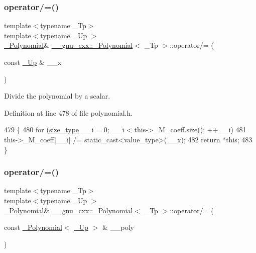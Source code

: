 \subsubsection{\texorpdfstring{operator/=()}{operator/=()}\hspace{0.1cm}{\footnotesize\ttfamily [1/2]}}
{\footnotesize\ttfamily template$<$typename \+\_\+\+Tp$>$ \\
template$<$typename \+\_\+\+Up $>$ \\
\hyperlink{class____gnu__cxx_1_1__Polynomial}{\+\_\+\+Polynomial}\& \hyperlink{class____gnu__cxx_1_1__Polynomial}{\+\_\+\+\_\+gnu\+\_\+cxx\+::\+\_\+\+Polynomial}$<$ \+\_\+\+Tp $>$\+::operator/= (\begin{DoxyParamCaption}\item[{const \hyperlink{class____gnu__cxx_1_1__Polynomial_a242114d4b86648a5dff67a8221f80d40}{\+\_\+\+Up} \&}]{\+\_\+\+\_\+x }\end{DoxyParamCaption})\hspace{0.3cm}{\ttfamily [inline]}}

Divide the polynomial by a scalar. 

Definition at line 478 of file polynomial.\+h.


\begin{DoxyCode}
479         \{
480           \textcolor{keywordflow}{for} (\hyperlink{class____gnu__cxx_1_1__Polynomial_a6afe219c123c7a2fdc5abac8a6639053}{size\_type} \_\_i = 0; \_\_i < this->\_M\_coeff.size(); ++\_\_i)
481             this->\_M\_coeff[\_\_i] /= static\_cast<value\_type>(\_\_x);
482           \textcolor{keywordflow}{return} *\textcolor{keyword}{this};
483         \}
\end{DoxyCode}
\mbox{\label{class____gnu__cxx_1_1__Polynomial_a3374e3ab44ed1478de27f688aae6c3f1}} 
\subsubsection{\texorpdfstring{operator/=()}{operator/=()}\hspace{0.1cm}{\footnotesize\ttfamily [2/2]}}
{\footnotesize\ttfamily template$<$typename \+\_\+\+Tp$>$ \\
template$<$typename \+\_\+\+Up $>$ \\
\hyperlink{class____gnu__cxx_1_1__Polynomial}{\+\_\+\+Polynomial}\& \hyperlink{class____gnu__cxx_1_1__Polynomial}{\+\_\+\+\_\+gnu\+\_\+cxx\+::\+\_\+\+Polynomial}$<$ \+\_\+\+Tp $>$\+::operator/= (\begin{DoxyParamCaption}\item[{const \hyperlink{class____gnu__cxx_1_1__Polynomial}{\+\_\+\+Polynomial}$<$ \hyperlink{class____gnu__cxx_1_1__Polynomial_a242114d4b86648a5dff67a8221f80d40}{\+\_\+\+Up} $>$ \&}]{\+\_\+\+\_\+poly }\end{DoxyParamCaption})\hspace{0.3cm}{\ttfamily [inline]}}


